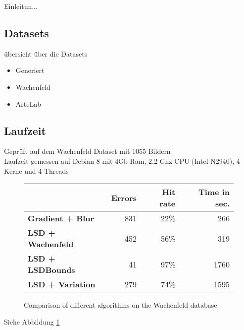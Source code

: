 Einleitun...
\subsection{Datasets}
übersicht über die Datasets
\begin{itemize}
\item Generiert
\item Wachenfeld \cite{wachenfeld2008robust}
\item ArteLab \cite{zamberletti2010neural} \cite{zamberletti2013robust}
\end{itemize}
\subsection{Laufzeit}
Geprüft auf dem Wachenfeld Dataset mit 1055 Bildern \cite{wachenfeld2008robust}\\
Laufzeit gemessen auf Debian 8 mit 4Gb Ram, 2.2 Ghz CPU (Intel N2940), 4 Kerne und 4 Threads

\begin{figure}[t]
\center
\bgroup
\def\arraystretch{1.5}
\begin{tabular}{|l|r|r|r|}
\hline
&\textbf{Errors}&\textbf{Hit rate}&\textbf{Time in sec.}\\
\hline
\textbf{Gradient + Blur}& 831& 22\%& 266\\
\hline
\textbf{LSD + Wachenfeld}& 452& 56\%& 319\\
\hline
\textbf{LSD + LSDBounds}& 41& 97\%& 1760\\
\hline
\textbf{LSD + Variation}& 279& 74\%& 1595\\
\hline
\end{tabular}
\egroup
\caption{Comparison of different algorithms on the Wachenfeld database \citep{wachenfeld2008robust}}
\label{laufzeit}
\end{figure}
Siehe Abbildung \ref{laufzeit}
 